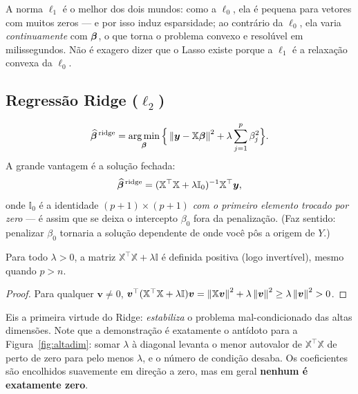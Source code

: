 \documentclass[11pt,a4paper]{article}
\begin{document}
\begin{ideia}
A norma $\ell_1$ é o melhor dos dois mundos: como a $\ell_0$, ela é pequena para
vetores com muitos zeros --- e por isso induz esparsidade; ao contrário da $\ell_0$,
ela varia \emph{continuamente} com $\bm{\beta}$, o que torna o problema convexo e
resolúvel em milissegundos. Não é exagero dizer que o Lasso existe porque a $\ell_1$
é a relaxação convexa da $\ell_0$.
\end{ideia}

\subsection{Regressão Ridge ($\ell_2$)}
\begin{equation}\label{eq:ridge}
  \widehat{\bbeta}^{\,\text{ridge}}
   = \argmin_{\bbeta}\Big\{ \norm{\bm{y}-\mathbb{X}\bbeta}^2
       + \lambda \sum_{j=1}^{p}\beta_j^2 \Big\}.
\end{equation}
A grande vantagem é a solução fechada:
\begin{equation}\label{eq:ridgesol}
  \widehat{\bm{\beta}}^{\,\text{ridge}}
   = (\mathbb{X}^\top\mathbb{X} + \lambda \mathbb{I}_0)^{-1}\mathbb{X}^\top\bm{y},
\end{equation}
onde $\mathbb{I}_0$ é a identidade $(p+1)\times(p+1)$ \emph{com o primeiro elemento
trocado por zero} --- é assim que se deixa o intercepto $\beta_0$ fora da
penalização. (Faz sentido: penalizar $\beta_0$ tornaria a solução dependente de onde
você pôs a origem de $Y$.)

\begin{proposicao}
Para todo $\lambda>0$, a matriz $\mathbb{X}^\top\mathbb{X}+\lambda\mathbb{I}$ é definida
positiva (logo invertível), mesmo quando $p>n$.
\end{proposicao}
\begin{proof}
Para qualquer $\bm{v}\neq 0$,
$\bm{v}^\top(\mathbb{X}^\top\mathbb{X}+\lambda\mathbb{I})\bm{v}
=\left\lVert \mathbb{X}\bm{v} \right\rVert^2+\lambda\left\lVert \bm{v} \right\rVert^2\ge \lambda\left\lVert \bm{v} \right\rVert^2>0$.
\end{proof}
Eis a primeira virtude do Ridge: \emph{estabiliza} o problema mal-condicionado das
altas dimensões. Note que a demonstração é exatamente o antídoto para a
Figura~\ref{fig:altadim}: somar $\lambda$ à diagonal levanta o menor autovalor de
$\mathbb{X}^\top\mathbb{X}$ de perto de zero para pelo menos $\lambda$, e o número de
condição desaba. Os coeficientes são encolhidos suavemente em direção a zero, mas
em geral \textbf{nenhum é exatamente zero}.
\end{document}
